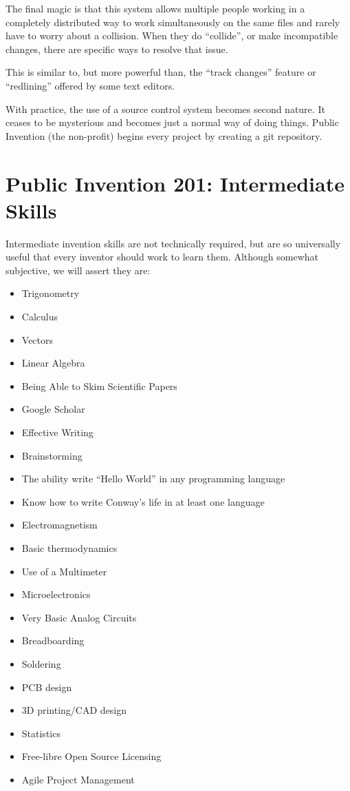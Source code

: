 \documentclass[
	fontsize=10pt, %
	twoside=false, %
	secnumdepth=1, %
]{kaobook}
\begin{document}
The final magic is that this system allows multiple people
working in a completely distributed way to work simultaneously
on the same files and rarely have to worry about a collision.
When they do ``collide'', or make incompatible changes, there
are specific ways to resolve that issue.

This is similar to, but more powerful than, the ``track changes'' feature
or ``redlining'' offered by some text editors.

With practice, the use of a source control system becomes second nature.
It ceases to be mysterious and becomes just a normal way of doing things.
Public Invention (the non-profit) begins every project by creating a git repository.

\chapter{Public Invention 201: Intermediate Skills}

Intermediate invention skills are not technically required,
but are so universally useful that every inventor should
work to learn them. Although somewhat subjective,
we will assert they are:
\begin{itemize}
\item Trigonometry
\item Calculus
\item Vectors
\item Linear Algebra
\item Being Able to Skim Scientific Papers
\item Google Scholar
\item Effective Writing
\item Brainstorming
\item The ability write “Hello World” in any programming language
\item Know how to write Conway’s life in at least one language
\item Electromagnetism
\item Basic thermodynamics
\item Use of a Multimeter
\item Microelectronics
\item Very Basic Analog Circuits
\item Breadboarding
\item Soldering
\item PCB design
\item 3D printing/CAD design
\item Statistics
\item Free-libre Open Source Licensing
\item Agile Project Management
\end{itemize}
\end{document}
